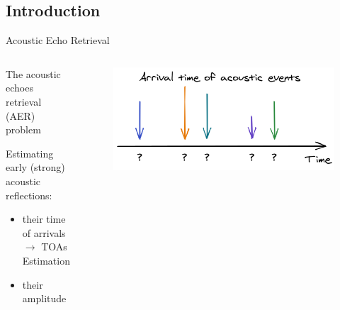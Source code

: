 \subsection{Introduction}

\begin{frame}{Acoustic Echo Retrieval}


    \begin{columns}[T,onlytextwidth]

        \begin{alertblock}{The acoustic echoes retrieval (AER) problem}

            \vspace{.1em}
            Estimating early (strong) acoustic reflections:
            \begin{itemize}
                \item their time of arrivals $\rightarrow$ TOAs Estimation
                \item their amplitude
            \end{itemize}
        \end{alertblock}

            \begin{figure}
                \centering
                \includegraphics[width=\textwidth]{./figures/arrivals.png}
            \end{figure}

    \end{columns}


\end{frame}
